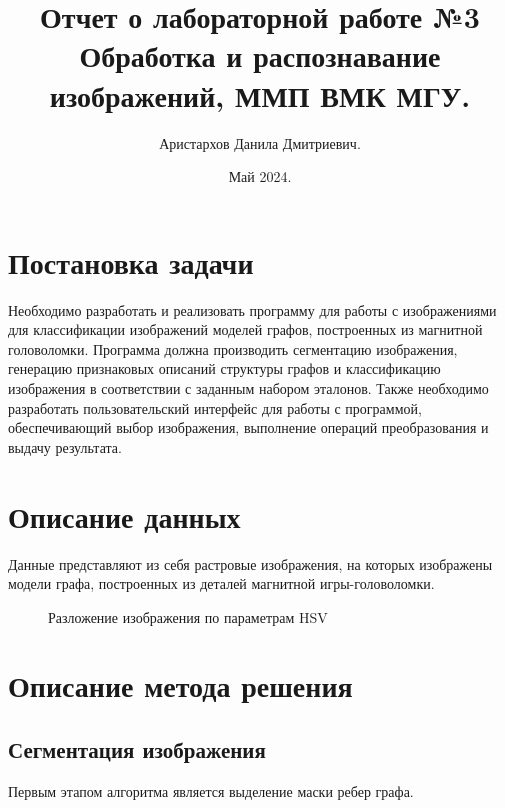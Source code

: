 \documentclass[11pt]{extarticle}
\title{Отчет о лабораторной работе №3 \\[6mm] \large Обработка и распознавание изображений, ММП ВМК МГУ.}
\author{Аристархов Данила Дмитриевич.}
\date{Май 2024.}
\begin{document}
\maketitle
{
  \hypersetup{linkcolor=black}
  \tableofcontents
}
\newpage

\section{Постановка задачи}
Необходимо разработать и реализовать программу для работы с изображениями для классификации изображений моделей графов,
построенных из магнитной головоломки. Программа должна производить сегментацию изображения, генерацию признаковых описаний структуры графов и классификацию изображения в соответствии с заданным набором эталонов. Также необходимо разработать пользовательский интерфейс для работы с программой, обеспечивающий выбор изображения, выполнение операций преобразования и выдачу результата.

\section{Описание данных}
Данные представляют из себя растровые изображения, на которых изображены модели графа, построенных из деталей магнитной игры-головоломки.

\begin{figure}[h]
  \centering
  
  \caption{Разложение изображения по параметрам HSV}
  \label{fig:channels}
\end{figure}

\section{Описание метода решения}
\subsection{Сегментация изображения}
Первым этапом алгоритма является выделение маски ребер графа.
\end{document}
